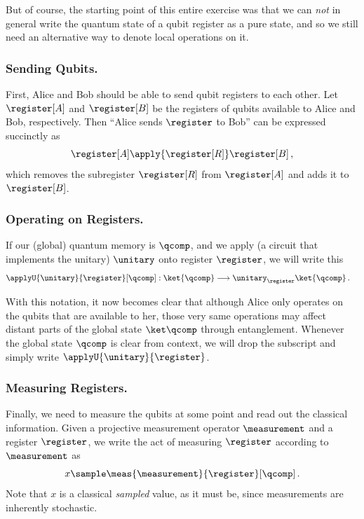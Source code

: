    But of course, the starting point of this entire exercise was that we
      can \emph{not} in general write 
      the quantum state of a qubit register as a pure state, and so we
      still need an alternative way to denote local operations on it.

  \subsubsection{Sending Qubits.}
    First, Alice and Bob should be able to send qubit registers to each
      other. Let $\register[A]$ and $\register[B]$ be the registers of qubits available to
      Alice and Bob, respectively. Then 
      ``Alice sends $\register$ to Bob'' can be expressed succinctly as
      \[
        \register[A] \apply{\register[R]} \register[B]\, ,
      \]
      which removes the subregister $\register[R]$ from $\register[A]$ and adds
      it to $\register[B]$. 

  \subsubsection{Operating on Registers.}
    If our (global) quantum memory is $\qcomp$, and we apply (a circuit
      that implements the unitary) $\unitary$ onto register $\register$, we
      will write this
      \begin{align*}
        \applyU{\unitary}{\register}[\qcomp] &: \ket{\qcomp} \longrightarrow
          \unitary_{\register} \ket{\qcomp}\, .
      \end{align*}

    \noindent
    With this notation, it now becomes clear that although Alice only operates on
      the qubits that are available to her, those very same operations may
      affect distant parts of the global state $\ket\qcomp$ through entanglement. 
      Whenever the global state $\qcomp$ is clear
      from context, we will drop the subscript and
      simply write $\applyU{\unitary}{\register}$. 

  \subsubsection{Measuring Registers.}
    Finally, we need to measure the qubits at some point and read out the
      classical information. Given a projective measurement operator
      $\measurement$ and a register $\register$, we write the act of
      measuring $\register$ according to $\measurement$ as
      \[
        x \sample \meas{\measurement}{\register}[\qcomp]\, .
      \]
      Note that $x$ is a classical \emph{sampled} value, as it must be, since
      measurements are inherently stochastic. 
        
